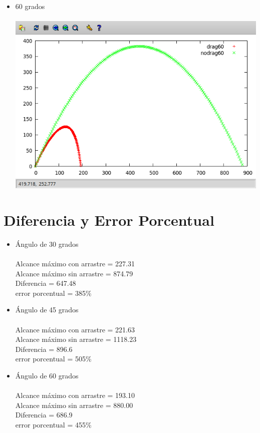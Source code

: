 \documentclass[10pt,a4paper]{article}
\begin{document}
\begin{itemize}
\item 60 grados
\\\\
\includegraphics[scale=0.5]{60grados}

\end{itemize}

\section*{Diferencia y Error Porcentual}

\begin{itemize}
\item \'Angulo de 30 grados
\\\\
Alcance m\'aximo con arrastre = 227.31\\
Alcance m\'aximo sin arrastre = 874.79\\
Diferencia = 647.48\\
error porcentual = 385\%\\

\item \'Angulo de 45 grados
\\\\
Alcance m\'aximo con arrastre = 221.63\\
Alcance m\'aximo sin arrastre = 1118.23\\
Diferencia = 896.6\\
error porcentual = 505\%\\

\item \'Angulo de 60 grados
\\\\
Alcance m\'aximo con arrastre = 193.10 \\
Alcance m\'aximo sin arrastre = 880.00\\
Diferencia = 686.9\\
error porcentual = 455\%\\



\end{itemize}
\end{document}

